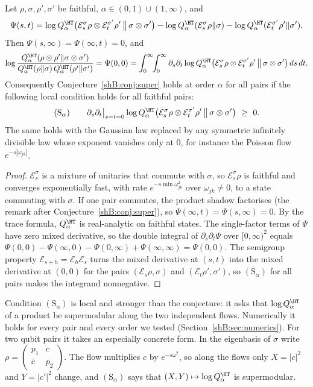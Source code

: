 \begin{theorem}\label{shB:thm:flow}
Let $\rho,\sigma,\rho',\sigma'$ be faithful, $\alpha\in(0,1)\cup(1,\infty)$, and
\[
\Psi(s,t)=\log Q^\HT_\alpha\big(\mathcal E^\sigma_s\rho\otimes\mathcal E^{\sigma'}_t\rho'\,\big\|\,\sigma\otimes\sigma'\big)-\log Q^\HT_\alpha(\mathcal E^\sigma_s\rho\|\sigma)-\log Q^\HT_\alpha(\mathcal E^{\sigma'}_t\rho'\|\sigma').
\]
Then $\Psi(s,\infty)=\Psi(\infty,t)=0$, and
\[
\log\frac{Q^\HT_\alpha(\rho\otimes\rho'\|\sigma\otimes\sigma')}{Q^\HT_\alpha(\rho\|\sigma)\,Q^\HT_\alpha(\rho'\|\sigma')}=\Psi(0,0)=\int_0^\infty\!\!\int_0^\infty\partial_s\partial_t\log Q^\HT_\alpha\big(\mathcal E^\sigma_s\rho\otimes\mathcal E^{\sigma'}_t\rho'\,\big\|\,\sigma\otimes\sigma'\big)\,ds\,dt .
\]
Consequently Conjecture~\ref{shB:conj:super} holds at order $\alpha$ for all pairs if the following local condition holds for all faithful pairs:
\[
(\mathrm S_\alpha)\qquad \partial_s\partial_t\big|_{s=t=0}\log Q^\HT_\alpha\big(\mathcal E^\sigma_s\rho\otimes\mathcal E^{\sigma'}_t\rho'\,\big\|\,\sigma\otimes\sigma'\big)\ \ge\ 0 .
\]
The same holds with the Gaussian law replaced by any symmetric infinitely divisible law whose exponent vanishes only at $0$, for instance the Poisson flow $e^{-s|\omega_{jk}|}$.
\end{theorem}

\begin{proof}
$\mathcal E^\sigma_s$ is a mixture of unitaries that commute with $\sigma$, so $\mathcal E^\sigma_s\rho$ is faithful and converges exponentially fast, with rate $e^{-s\min\omega_{jk}^2}$ over $\omega_{jk}\ne0$, to a state commuting with $\sigma$. If one pair commutes, the product shadow factorises (the remark after Conjecture~\ref{shB:conj:super}), so $\Psi(\infty,t)=\Psi(s,\infty)=0$. By the trace formula, $Q^\HT_\alpha$ is real-analytic on faithful states. The single-factor terms of $\Psi$ have zero mixed derivative, so the double integral of $\partial_s\partial_t\Psi$ over $[0,\infty)^2$ equals $\Psi(0,0)-\Psi(\infty,0)-\Psi(0,\infty)+\Psi(\infty,\infty)=\Psi(0,0)$. The semigroup property $\mathcal E_{s+h}=\mathcal E_h\mathcal E_s$ turns the mixed derivative at $(s,t)$ into the mixed derivative at $(0,0)$ for the pairs $(\mathcal E_s\rho,\sigma)$ and $(\mathcal E_t\rho',\sigma')$, so $(\mathrm S_\alpha)$ for all pairs makes the integrand nonnegative.
\end{proof}

Condition $(\mathrm S_\alpha)$ is local and stronger than the conjecture: it asks that $\log Q^\HT_\alpha$ of a product be supermodular along the two independent flows. Numerically it holds for every pair and every order we tested (Section~\ref{shB:sec:numerics}). For two qubit pairs it takes an especially concrete form. In the eigenbasis of $\sigma$ write $\rho=\begin{pmatrix}p_1&c\\ \bar c&p_2\end{pmatrix}$. The flow multiplies $c$ by $e^{-s\omega^2}$, so along the flows only $X=|c|^2$ and $Y=|c'|^2$ change, and $(\mathrm S_\alpha)$ says that $(X,Y)\mapsto\log Q^\HT_\alpha$ is supermodular.

